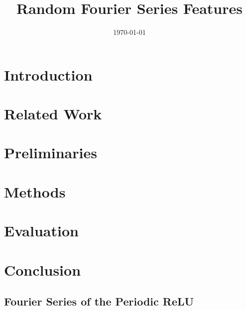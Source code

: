 \documentclass[11pt, a4paper, conference, romanappendices, twocolumn]{IEEEtran}
\begin{document}
    \title{Random Fourier Series Features}
    \author{
        \and
        \and
    }
    \date{\today}

    \maketitle

    \begin{abstract}
        
    \end{abstract}

    \section{Introduction}
    

    \section{Related Work}
    

    \section{Preliminaries}
    

    \section{Methods}
    

    \section{Evaluation}
    

    \section{Conclusion}
    

    \FloatBarrier
    
    
    \FloatBarrier

    \appendix
    \subsection{Fourier Series of the Periodic ReLU}  \label{app:perelu}
    
\end{document}

